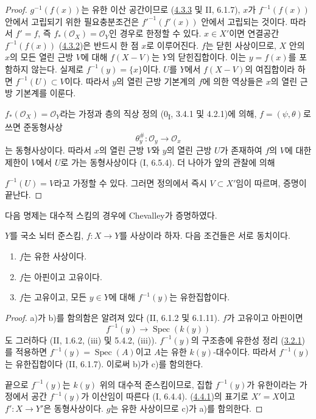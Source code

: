 \begin{proof}
$g^{-1}(f(x))$는 유한 이산 공간이므로
(\hyperref[III.4.3.3-fr]{4.3.3} 및 II, 6.1.7), $x$가
$f^{-1}(f(x))$ 안에서 고립되기 위한 필요충분조건은
$f'^{-1}(f'(x))$ 안에서 고립되는 것이다. 따라서 $f'=f$, 즉
$f_*(\mathcal O_X)=\mathcal O_Y$인 경우로 한정할 수 있다.
$x\in X'$이면 연결공간 $f^{-1}(f(x))$
(\hyperref[III.4.3.2-fr]{4.3.2})은 반드시 한 점 $x$로 이루어진다.
$f$는 닫힌 사상이므로, $X$ 안의 $x$의 모든 열린 근방 $V$에 대해
$f(X-V)$는 $Y$의 닫힌집합이다. 이는 $y=f(x)$를 포함하지 않는다.
실제로 $f^{-1}(y)=\{x\}$이다. $U$를 $Y$에서 $f(X-V)$의 여집합이라
하면 $f^{-1}(U)\subset V$이다. 따라서 $y$의 열린 근방 기본계의
$f$에 의한 역상들은 $x$의 열린 근방 기본계를 이룬다.

$f_*(\mathcal O_X)=\mathcal O_Y$라는 가정과 층의 직상 정의
(0\textsubscript{I}, 3.4.1 및 4.2.1)에 의해, $f=(\psi,\theta)$로
쓰면 준동형사상
\[
\theta_y^\#:\mathcal O_y\longrightarrow\mathcal O_x
\]
는 동형사상이다. 따라서 $x$의 열린 근방 $V$와 $y$의 열린 근방
$U$가 존재하여 $f$의 $V$에 대한 제한이 $V$에서 $U$로 가는
동형사상이다 (I, 6.5.4). 더 나아가 앞의 관찰에 의해


$f^{-1}(U)=V$라고 가정할 수 있다. 그러면 정의에서 즉시
$V\subset X'$임이 따르며, 증명이 끝난다.
\end{proof}

다음 명제는 대수적 스킴의 경우에 Chevalley가 증명하였다.

\begin{proposition}[4.4.2]
\label{III.4.4.2-fr}
$Y$를 국소 뇌터 준스킴, $f:X\to Y$를 사상이라 하자. 다음 조건들은
서로 동치이다.
\begin{enumerate}
\item[a)] $f$는 유한 사상이다.
\item[b)] $f$는 아핀이고 고유이다.
\item[c)] $f$는 고유이고, 모든 $y\in Y$에 대해 $f^{-1}(y)$는
유한집합이다.
\end{enumerate}
\end{proposition}

\begin{proof}
a)가 b)를 함의함은 알려져 있다 (II, 6.1.2 및 6.1.11). $f$가
고유이고 아핀이면
\[
f^{-1}(y)\longrightarrow\operatorname{Spec}(k(y))
\]
도 그러하다 (II, 1.6.2, (iii) 및 5.4.2, (iii)). $f^{-1}(y)$의
구조층에 유한성 정리 (\hyperref[III.3.2.1-fr]{3.2.1})를 적용하면
$f^{-1}(y)=\operatorname{Spec}(A)$이고 $A$는 유한 $k(y)$-대수이다.
따라서 $f^{-1}(y)$는 유한집합이다 (II, 6.1.7). 이로써 b)가 c)를
함의한다.

끝으로 $f^{-1}(y)$는 $k(y)$ 위의 대수적 준스킴이므로, 집합
$f^{-1}(y)$가 유한이라는 가정에서 공간 $f^{-1}(y)$가 이산임이
따른다 (I, 6.4.4). (\hyperref[III.4.4.1-fr]{4.4.1})의 표기로
$X'=X$이고 $f':X\to Y'$은 동형사상이다. $g$는 유한 사상이므로
c)가 a)를 함의한다.
\end{proof}

